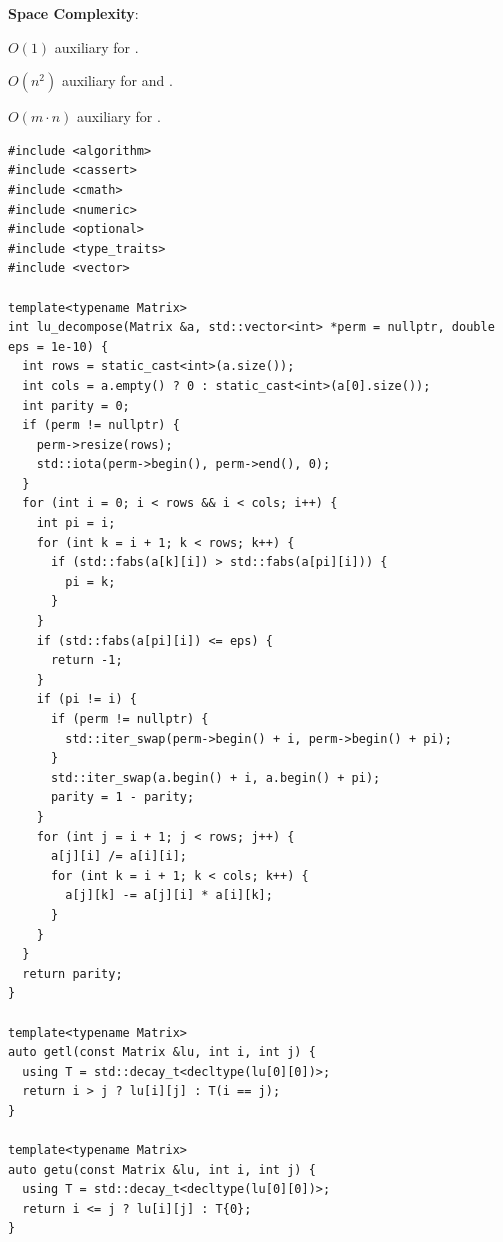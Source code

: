 \textbf{Space Complexity}:
\begin{compactitem}
  \item $O(1)$ auxiliary for .
  \item $O(n^{2})$ auxiliary for  and .
  \item $O(m \cdot n)$ auxiliary for .
\end{compactitem}

\begin{lstlisting}[style=cpp]
#include <algorithm>
#include <cassert>
#include <cmath>
#include <numeric>
#include <optional>
#include <type_traits>
#include <vector>

template<typename Matrix>
int lu_decompose(Matrix &a, std::vector<int> *perm = nullptr, double eps = 1e-10) {
  int rows = static_cast<int>(a.size());
  int cols = a.empty() ? 0 : static_cast<int>(a[0].size());
  int parity = 0;
  if (perm != nullptr) {
    perm->resize(rows);
    std::iota(perm->begin(), perm->end(), 0);
  }
  for (int i = 0; i < rows && i < cols; i++) {
    int pi = i;
    for (int k = i + 1; k < rows; k++) {
      if (std::fabs(a[k][i]) > std::fabs(a[pi][i])) {
        pi = k;
      }
    }
    if (std::fabs(a[pi][i]) <= eps) {
      return -1;
    }
    if (pi != i) {
      if (perm != nullptr) {
        std::iter_swap(perm->begin() + i, perm->begin() + pi);
      }
      std::iter_swap(a.begin() + i, a.begin() + pi);
      parity = 1 - parity;
    }
    for (int j = i + 1; j < rows; j++) {
      a[j][i] /= a[i][i];
      for (int k = i + 1; k < cols; k++) {
        a[j][k] -= a[j][i] * a[i][k];
      }
    }
  }
  return parity;
}

template<typename Matrix>
auto getl(const Matrix &lu, int i, int j) {
  using T = std::decay_t<decltype(lu[0][0])>;
  return i > j ? lu[i][j] : T(i == j);
}

template<typename Matrix>
auto getu(const Matrix &lu, int i, int j) {
  using T = std::decay_t<decltype(lu[0][0])>;
  return i <= j ? lu[i][j] : T{0};
}


\end{lstlisting}
